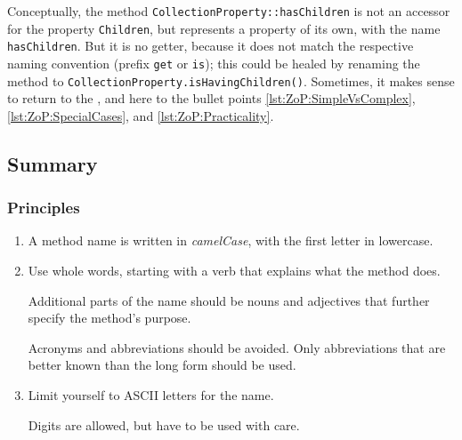 Conceptually, the method \lstinline|CollectionProperty::hasChildren| is not an accessor for the property \texttt{Children}, but represents a property of its own, with the name \texttt{hasChildren}. But it is no getter, because it does not match the respective naming convention (prefix \lstinline|get| or \lstinline|is|); this could be healed by renaming the method to \lstinline|CollectionProperty.isHavingChildren()|. Sometimes, it makes sense to return to the \ngref, and here to the bullet points \ref{lst:ZoP:SimpleVsComplex}, \ref{lst:ZoP:SpecialCases}, and \ref{lst:ZoP:Practicality}.


\subsection{Summary}

\subsubsection{Principles}
\begin{enumerate}[label=P\arabic*.]
	\item{A method name is written in \textit{camelCase}, with the first letter in lowercase.}
	
	\item{Use whole words, starting with a verb that explains what the method does.
	
	Additional parts of the name should be nouns and adjectives that further specify the method's purpose.
	
	Acronyms and abbreviations should be avoided. Only abbreviations that are better known than the long form should be used.}
	
	\item{Limit yourself to ASCII letters for the name.
	
	Digits are allowed, but have to be used with care.}
\end{enumerate}

